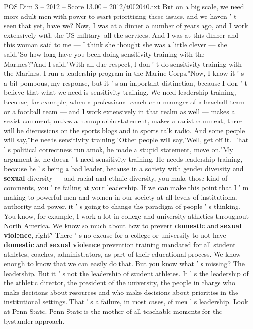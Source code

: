 \begin{textsample}{POS Dim 3 – 2012 – Score 13.00 – 2012/t002040.txt}
But on a big scale, we need more adult men with power to start prioritizing these issues, and we haven ' t seen that yet, have we?
Now, I was at a dinner a number of years ago, and I work extensively with the US military, all the services.
And I was at this dinner and this woman said to me — I think she thought she was a little clever — she said,"So how long have you been doing sensitivity training with the Marines?"And I said,"With all due respect, I don ' t do sensitivity training with the Marines.
I run a leadership program in the Marine Corps."Now, I know it ' s a bit pompous, my response, but it ' s an important distinction, because I don ' t believe that what we need is sensitivity training.
We need leadership training, because, for example, when a professional coach or a manager of a baseball team or a football team — and I work extensively in that realm as well — makes a sexist comment, makes a homophobic statement, makes a racist comment, there will be discussions on the sports blogs and in sports talk radio.
And some people will say,"He needs sensitivity training."Other people will say,"Well, get off it.
That ' s political correctness run amok, he made a stupid statement, move on."My argument is, he doesn ' t need sensitivity training.
He needs leadership training, because he ' s being a bad leader, because in a society with gender diversity and \textbf{sexual} diversity — and racial and ethnic diversity, you make those kind of comments, you ' re failing at your leadership.
If we can make this point that I ' m making to powerful men and women in our society at all levels of institutional authority and power, it ' s going to change the paradigm of people ' s thinking.
You know, for example, I work a lot in college and university athletics throughout North America.
We know so much about how to prevent \textbf{domestic} and \textbf{sexual} \textbf{violence}, right?
There ' s no excuse for a college or university to not have \textbf{domestic} and \textbf{sexual} \textbf{violence} prevention training mandated for all student athletes, coaches, administrators, as part of their educational process.
We know enough to know that we can easily do that.
But you know what ' s missing?
The leadership.
But it ' s not the leadership of student athletes.
It ' s the leadership of the athletic director, the president of the university, the people in charge who make decisions about resources and who make decisions about priorities in the institutional settings.
That ' s a failure, in most cases, of men ' s leadership.
Look at Penn State.
Penn State is the mother of all teachable moments for the bystander approach.

\end{textsample}
